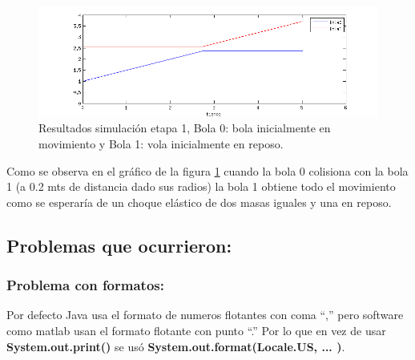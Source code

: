 \documentclass[a4paper,10pt]{article}
\begin{document}
\begin{figure}[H]
 \centering
 \includegraphics[scale=0.5]{./simulacion_etapa1.png}
 \caption{Resultados simulación etapa 1, Bola 0: bola inicialmente en movimiento y Bola 1: vola inicialmente en reposo.}
  \label{etapa1.2}
\end{figure}

Como se observa en el gráfico de la figura \ref{etapa1.2} cuando la bola 0 colisiona con la bola 1 (a 0.2 mts de distancia dado sus radios) 
la bola 1 obtiene todo el movimiento como se esperaría de un choque elástico de dos masas iguales y una en reposo.\newline

\subsection{Problemas que ocurrieron:}
\subsubsection{Problema con formatos:}
Por defecto Java usa el formato de numeros flotantes con coma ``,'' pero software como matlab usan el formato flotante con punto ``.''
Por lo que en vez de usar \textbf{System.out.print()} se usó \textbf{System.out.format(Locale.US, ... )}.\newline
\end{document}
